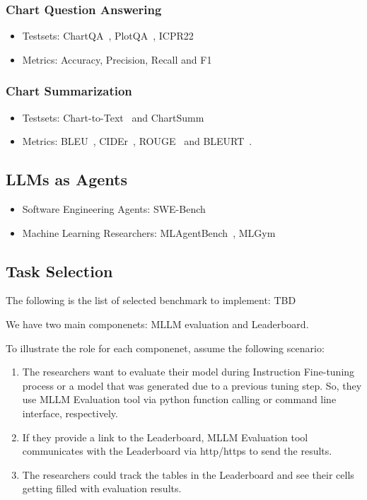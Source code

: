 \documentclass[
	letterpaper, %
]{jdf}
\begin{document}
\subsubsection{Chart Question Answering}
\begin{itemize}
    \item Testsets: ChartQA~\cite{masry2022chartqa}, PlotQA~\cite{methani2020plotqa}, ICPR22
         \item Metrics: Accuracy, Precision, Recall and F1
              \end{itemize}
\subsubsection{Chart Summarization}
\begin{itemize}
    \item Testsets: Chart-to-Text~\cite{kantharaj2022chart} and ChartSumm~\cite{rahman2023chartsumm}
    \item Metrics: BLEU~\cite{post2018call}, CIDEr~\cite{vedantam2015cider}, ROUGE~\cite{lin2004rouge} and BLEURT~\cite{sellam2020bleurt}.
              \end{itemize}
\subsection{LLMs as Agents}
\begin{itemize}
    \item Software Engineering Agents: SWE-Bench~\cite{yang2024swe}
    \item Machine Learning Researchers: MLAgentBench~\cite{huang2023mlagentbench}, MLGym~\cite{nathani2025mlgym}
              \end{itemize}
\subsection{Task Selection}\label{app:selected-tasks}
The following is the list of selected benchmark to implement: TBD

We have two main componenets: MLLM evaluation and Leaderboard.

To illustrate the role for each componenet, assume the following scenario:
\begin{enumerate}
         \item The researchers want to evaluate their model during Instruction Fine-tuning process or a model that was generated due to a previous tuning step.
             So, they use MLLM Evaluation tool via python function calling or command line interface, respectively.
         \item If they provide a link to the Leaderboard, MLLM Evaluation tool communicates with the Leaderboard via http/https to send the results.
         \item The researchers could track the tables in the Leaderboard and see their cells getting filled with evaluation results.
              \end{enumerate}
\end{document}
